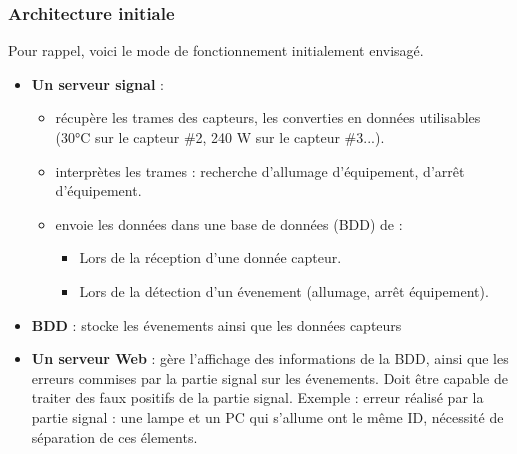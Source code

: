\documentclass[10pt,a4paper]{article}
\begin{document}
\subsubsection{Architecture initiale}
Pour rappel, voici le mode de fonctionnement initialement envisagé.
\begin{itemize}
  \item \textbf{Un serveur signal} :
  \begin{itemize}
    \item récupère les trames des capteurs, les converties en données utilisables (30°C sur le capteur \#2, 240 W sur le capteur \#3...).
    \item interprètes les trames : recherche d'allumage d'équipement, d'arrêt d'équipement.
    \item envoie les données dans une base de données (BDD) de :
    \begin{itemize}
      \item Lors de la réception d'une donnée capteur.
      \item Lors de la détection d'un évenement (allumage, arrêt équipement).
    \end{itemize}
  \end{itemize}
  \item \textbf{BDD} : stocke les évenements ainsi que les données capteurs
  \item \textbf{Un serveur Web} : gère l'affichage des informations de la BDD, ainsi que les erreurs commises par la partie signal sur les évenements. Doit être capable de traiter des faux positifs de la partie signal. Exemple : erreur réalisé par la partie signal : une lampe et un PC qui s'allume ont le même ID, nécessité de séparation de ces élements.
\end{itemize}
\end{document}

